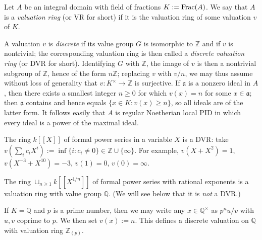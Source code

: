 \documentclass[reqno]{amsart}
\begin{document}
\begin{definition}
  Let $A$ be an integral domain with field of fractions
  $K := \operatorname{Frac}(A)$.  We say that $A$ is a \emph{valuation ring}
  (or VR for short) if it is the valuation ring of some
  valuation $v$ of $K$.

  A valuation $v$ is \emph{discrete} if its value group $G$ is
  isomorphic to $\mathbb{Z}$ and if $v$ is nontrivial; the
  corresponding valuation ring is then called a \emph{discrete
    valuation ring} (or DVR for short).  Identifying $G$ with
  $\mathbb{Z}$, the image of $v$ is then a nontrivial subgroup
  of $\mathbb{Z}$, hence of the form $n \mathbb{Z}$; replacing
  $v$ with $v/n$, we may thus assume without loss of generality
  that $v : K^\times \rightarrow \mathbb{Z}$ is surjective.  If
  $\mathfrak{a}$ is a nonzero ideal in $A$, then there exists a
  smallest integer $n \geq 0$ for which $v(x) = n$ for some
  $x \in \mathfrak{a}$; then $\mathfrak{a}$ contains and hence
  equals $\{x \in K : v(x) \geq n\}$, so all ideals are of the
  latter form.  It follows easily that $A$ is regular Noetherian
  local PID in which every ideal is a power of the maximal
  ideal.
\end{definition}

\begin{example}
  The ring $k[[X]]$ of formal power series in a variable $X$ is
  a DVR: take
  $v(\sum_{i} c_i X^i) := \inf \{i : c_i \neq 0\} \in \mathbb{Z}
  \cup \{\infty\}$.  For example, $v(X + X^2) = 1$,
  $v(X^{-3} + X^{10}) = -3$, $v(1) = 0$, $v(0) = \infty$.

  The ring $\cup_{n \geq 1} k[[X^{1/n}]]$ of formal power series
  with rational exponents is a valuation ring with value group
  $\mathbb{Q}$.  (We will see below that it is \emph{not} a
  DVR.)

  If $K = \mathbb{Q}$
  and
  $p$ is a prime number,
  then we may write any $x \in \mathbb{Q}^\times$
  as $p^n u/v$ with $u,v$ coprime to $p$.
  We then set $v(x) := n$.
  This defines a discrete valuation on $\mathbb{Q}$
  with valuation ring $\mathbb{Z}_{(p)}$.
\end{example}
\end{document}
